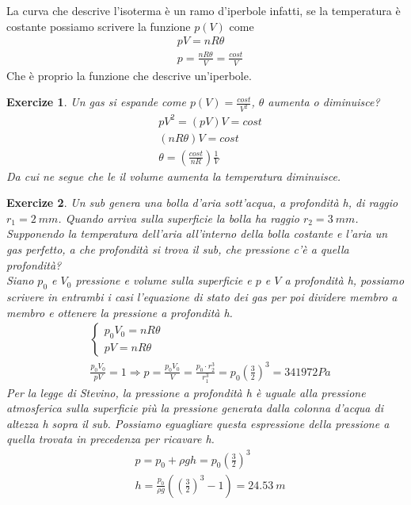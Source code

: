 \documentclass[10pt,a4paper]{article}
\newtheorem{exercize}{Exercize}
\begin{document}
\FloatBarrier
 La curva che descrive l'isoterma è un ramo d'iperbole infatti, se la temperatura è costante possiamo scrivere la funzione $p(V)$ come
 \begin{align*}
 	&p V  = nR\theta \\
 	&p = \frac{n R \theta}{V} = \frac{cost}{V}
 \end{align*}
Che è proprio la funzione che descrive un'iperbole.
\begin{exercize}
 Un gas si espande come $p(V) = \frac{cost}{V^2}$, $\theta$ aumenta o diminuisce? 
 \begin{align*}
 	&p V^2 = \left(p V \right) V = cost\\
 	&\left(n R \theta\right) V = cost\\
 	& \theta = \left(\frac{cost}{n R}\right)\frac{1}{V}
 \end{align*} 
Da cui ne segue che le il volume aumenta la temperatura diminuisce.
\end{exercize}
\begin{exercize}
Un sub genera una bolla d'aria sott'acqua, a profondità h, di raggio $r_1 = 2\ mm$. Quando arriva sulla superficie la bolla ha raggio $r_2 = 3\ mm$. Supponendo la temperatura dell'aria all'interno della bolla costante e l'aria un gas perfetto, a che profondità si trova il sub, che pressione c'è a quella profondità?\\
Siano $p_0$ e $V_0$ pressione e volume sulla superficie e $p$ e $V$ a profondità h, possiamo scrivere in entrambi i casi l'equazione di stato dei gas per poi dividere membro a membro e ottenere la pressione a profondità h. 
\begin{align*}
&\begin{cases}
p_0 V_0 = n R \theta\\
pV = nR\theta
\end{cases}\\
&\frac{p_0 V_0}{p V}=1 \Rightarrow p = \frac{p_0 V_0}{V} = \frac{p_0 \cdot r_2^3}{r_1^3} = p_0 \left(\frac{3}{2}\right)^3 = 341972 Pa
\end{align*}
Per la legge di Stevino, la pressione a profondità h è uguale alla pressione atmosferica sulla superficie più la pressione generata dalla colonna d'acqua di altezza h sopra il sub. Possiamo eguagliare questa espressione della pressione a quella trovata in precedenza per ricavare h.
\begin{align*}
&p = p_0 + \rho g h = p_0 \left(\frac{3}{2}\right)^3\\
&h =\frac{p_0}{\rho g} \left(\left(\frac{3}{2}\right)^3 - 1\right) = 24.53\ m 
\end{align*}
\end{exercize}
\end{document}
